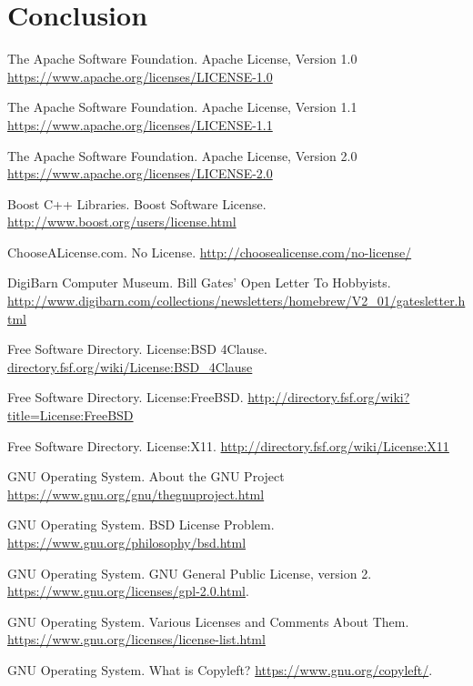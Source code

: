 \documentclass[12pt,letterpaper]{article}
\begin{document}
\section{Conclusion}

\newpage

\begin{thebibliography}{20}

 The Apache Software Foundation. Apache License, Version 1.0 \url{https://www.apache.org/licenses/LICENSE-1.0}

 The Apache Software Foundation. Apache License, Version 1.1 \url{https://www.apache.org/licenses/LICENSE-1.1}

 The Apache Software Foundation. Apache License, Version 2.0 \url{https://www.apache.org/licenses/LICENSE-2.0}

 Boost C++ Libraries. Boost Software License. \url{http://www.boost.org/users/license.html}

 ChooseALicense.com. No License. \url{http://choosealicense.com/no-license/}

 DigiBarn Computer Museum. Bill Gates' Open Letter To Hobbyists. \url{http://www.digibarn.com/collections/newsletters/homebrew/V2_01/gatesletter.html}

 Free Software Directory. License:BSD 4Clause. \url{directory.fsf.org/wiki/License:BSD_4Clause}

 Free Software Directory. License:FreeBSD. \url{http://directory.fsf.org/wiki?title=License:FreeBSD}

 Free Software Directory. License:X11. \url{http://directory.fsf.org/wiki/License:X11}

 GNU Operating System. About the GNU Project \url{https://www.gnu.org/gnu/thegnuproject.html}

 GNU Operating System. BSD License Problem. \url{https://www.gnu.org/philosophy/bsd.html}

 GNU Operating System. GNU General Public License, version 2. \url{https://www.gnu.org/licenses/gpl-2.0.html}.

 GNU Operating System. Various Licenses and Comments About Them. \url{https://www.gnu.org/licenses/license-list.html}

 GNU Operating System. What is Copyleft? \url{https://www.gnu.org/copyleft/}.


\end{thebibliography}
\end{document}
